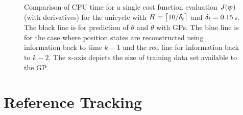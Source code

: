 \begin{figure}
\centering \small
{}
\caption{Comparison of CPU time for a single cost function evaluation $J(\boldsymbol{\psi})$ (with derivatives)  for the unicycle with $H = \big\lceil 10/\delta_t \big\rceil$ and $\delta_t = 0.15\,$s. The black line is for prediction of $\theta$ and $\dot\theta$ with GPs. The blue line is for the case where position states are reconstructed using information back to time $k-1$ and the red line for information back to $k-2$. The x-axis depicts the size of training data set available to the GP.}
\label{fig:unicomps}
\end{figure}




\section{Reference Tracking}
\label{sec:reffy}




